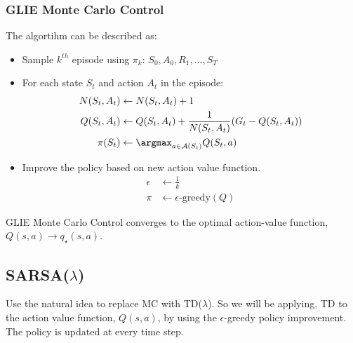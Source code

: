\subsubsection{GLIE Monte Carlo Control}
The algortihm can be described as:
\begin{itemize}
  \item Sample \(k^{th}\) episode using \(\pi_k\): \(S_0, A_0, R_1, \dots, S_{T}\)
  \item For each state \(S_t\) and action \(A_t\) in the episode:
  \[
    \begin{aligned}
      N(S_t, A_t) &\leftarrow N(S_t, A_t) + 1 \\
      Q(S_t, A_t) &\leftarrow Q(S_t, A_t) + \frac{1}{N(S_t, A_t)} (G_t - Q(S_t, A_t)) \\
      \pi(S_t) &\leftarrow \argmax_{a \in \mathcal{A}(S_t)} Q(S_t, a)  
    \end{aligned}
  \]
  \item Improve the policy based on new action value function.
  \[
    \begin{aligned}
      \epsilon &\leftarrow \frac{1}{k} \\
      \pi &\leftarrow \epsilon\text{-greedy}(Q)
    \end{aligned}
  \]
\end{itemize}
\begin{theorem}
  GLIE Monte Carlo Control converges to the optimal action-value function, \(Q(s,a) \to
  q_\star(s,a)\).
\end{theorem}

\subsection{SARSA(\(\lambda \))}
Use the natural idea to replace MC with TD(\(\lambda\)). So we will be applying,
TD to the action value function, \(Q(s,a)\), by using the \(\epsilon\)-greedy policy
improvement. The policy is updated at every time step.

